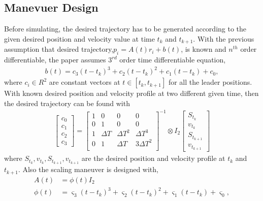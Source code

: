 \subsection*{Manevuer Design} \label{Manevuer Design}
 Before simulating, the desired trajectory has to be generated according to the given desired position and velocity value at time $t_k$ and $t_{k+1}$. With the previous assumption that desired trajectory,$p_i = A(t) r_i + b(t)$, is known and $n^{th}$ order differentiable, the paper assumes $3^{rd}$ order time differentiable equation, 
 \begin{align*}
    b(t) = c_3(t-t_k)^3 + c_2 (t-t_k)^2  + c_1 (t-t_k) + c_0,
 \end{align*}
 where $c_i \in R^{2}$ are constant vectors at $t \in [t_k, t_{k+1}]$ for all the leader positions. With known desired position and velocity profile at two different given time, then the desired trajectory can be found with 
 \begin{align*}
    \begin{bmatrix}
        c_0\\c_1\\c_2\\c_3
    \end{bmatrix}
    = \begin{bmatrix}
        1 & 0 & 0 & 0 \\
        0 & 1 & 0 & 0 \\
        1 & \Delta T & \Delta T ^2 & \Delta T^3 \\
        0 & 1 & \Delta T  & 3\Delta T^2 \\
    \end{bmatrix}^{-1}
    \otimes I_2 
    \begin{bmatrix}
        S_{t_k}\\v_{t_k}\\S_{t_{k+1}}\\v_{t_{k+1}}
    \end{bmatrix}
 \end{align*}
 where $S_{t_k},v_{t_k},S_{t_{k+1}},v_{t_{k+1}}$ are the desired position and velocity profile at $t_k$ and $t_{k+1}$.
 Also the scaling maneuver is designed with, 
 \begin{align*}
    A(t) &= \phi (t) I_2\\
    \phi (t) &=  \varsigma_3(t-t_k)^3 + \varsigma_2 (t-t_k)^2  + \varsigma_1 (t-t_k) + \varsigma_0,
 \end{align*}
